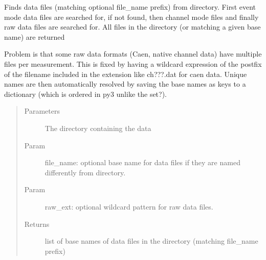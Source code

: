 \documentclass[letterpaper,10pt,english]{sphinxmanual}
\begin{document}
\begin{fulllineitems}
\label{\detokenize{autodocs/misc:listmode.misc.parse_file}}
\sphinxAtStartPar
Finds data files (matching optional file\_name prefix) from directory. First event mode data files are searched for, if not
found, then channel mode files and finally raw data files are searched for. All files in the directory (or matching
a given base name) are returned

\sphinxAtStartPar
Problem is that some raw data formats (Caen, native channel data) have multiple files per measurement. This is fixed
by having a wildcard expression of the postfix of the filename included in the extension
like ch???.dat for caen data. Unique names are then automatically resolved by saving the base names as keys to a
dictionary (which is ordered in py3 unlike the set?).
\begin{quote}\begin{description}
\item[{Parameters}] \leavevmode
\sphinxAtStartPar
{} \textendash{} The directory containing the data

\item[{Param}] \leavevmode
\sphinxAtStartPar
file\_name: optional base name for data files if they are named differently from directory.

\item[{Param}] \leavevmode
\sphinxAtStartPar
raw\_ext: optional wildcard pattern for raw data files.

\item[{Returns}] \leavevmode
\sphinxAtStartPar
list of base names of data files in the directory (matching file\_name prefix)

\end{description}\end{quote}

\end{fulllineitems}

\end{document}
